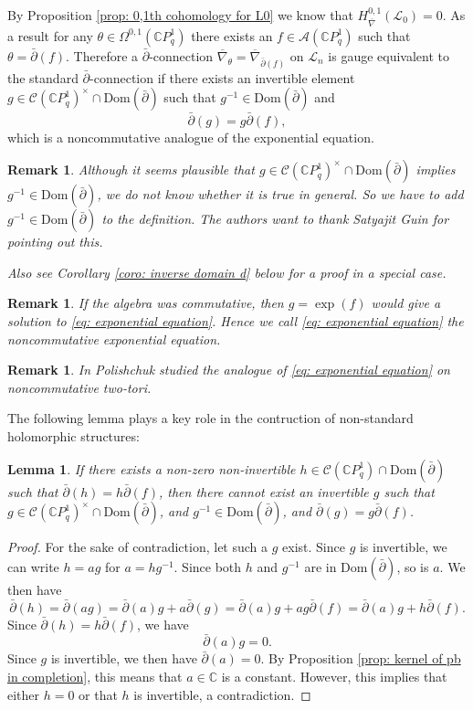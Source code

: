 \documentclass[12pt]{article}
\newtheorem{remark}[definition]{Remark}
\newtheorem{lemma}[definition]{Lemma}
\numberwithin{equation}{section}
\def\Dom{{\mathrm {Dom}}}
\def\pb{\bar{\partial}}
\def\C{{\mathbb C}}
\def\A{\mathcal{A}}
\def\L{\mathcal{L}}
\begin{document}
By Proposition \ref{prop: 0,1th cohomology for L0} we know that $H^{0,1}_{\overline{\nabla}}(\L_0)=0.$ As a result for any $\theta\in \Omega^{0,1}(\C P^1_q)$ there exists an $f\in \A(\C P^1_q)$ such that $\theta=\pb (f)$. Therefore a $\pb$-connection $\overline{\nabla}_{\theta}=\overline{\nabla}_{\pb(f)}$ on  $\L_n$ is gauge equivalent to the standard $\pb$-connection if there exists an invertible element $g\in \mathcal{C}(\C P^1_q)^{\times}\cap \Dom(\pb)$ such that $g^{-1}\in \Dom(\pb)$ and
     \begin{equation}\label{eq: exponential equation}
        \pb(g)=g\pb(f),
     \end{equation}
which is a noncommutative analogue of the exponential equation.

\begin{remark}
Although it seems plausible that $g\in \mathcal{C}(\C P^1_q)^{\times}\cap \Dom(\pb)$ implies $g^{-1}\in \Dom(\pb)$, we do not know whether it is true in general. So we have to add $g^{-1}\in \Dom(\pb)$ to the definition. The authors want to thank Satyajit Guin for pointing out this. 

Also see Corollary \ref{coro: inverse domain d} below for a proof in a special case.
\end{remark}

\begin{remark}
If the algebra was commutative, then $g=\exp(f)$ would give a solution to \eqref{eq: exponential equation}. Hence we call \eqref{eq: exponential equation} the noncommutative exponential equation.
\end{remark}


\begin{remark}
In \cite{polishchuk2006analogues} Polishchuk studied the analogue of \eqref{eq: exponential equation} on noncommutative two-tori.
\end{remark}

The following lemma plays a key role in the contruction of non-standard holomorphic structures:

\begin{lemma}\label{lemma: non zero solution non gauge equivalent}
    If there exists a non-zero non-invertible $h \in \mathcal{C}(\C P^1_q)\cap \Dom(\pb)$ such that $\pb (h) = h \pb (f)$, then there cannot exist an invertible $g$ such that  $g\in \mathcal{C}(\C P^1_q)^{\times}\cap \Dom(\pb)$, and  $g^{-1}\in \Dom(\pb)$, and $\pb (g) = g \pb (f)$.
\end{lemma}
\begin{proof}
    For the sake of contradiction, let such a $g$ exist. Since $g$ is invertible, we can write   $h = ag$ for $a = h g^{-1}$. Since both $h$ and $g^{-1}$ are in $\Dom(\pb)$, so is $a$.  We then  have
    $$
    \pb(h)=\pb(ag)=\pb(a)g+a\pb(g)=\pb(a)g+ag\pb(f)=\pb(a)g+h\pb(f).
    $$
    Since $\pb (h) = h \pb (f)$, we have \[
     \pb(a) g = 0.
    \]
    Since $g$ is invertible, we then have $\pb(a) = 0$. By Proposition \ref{prop: kernel of pb in completion}, this means that $a\in \C $ is a constant. However, this implies that either $h = 0$ or that $h$ is invertible, a contradiction.
\end{proof}
\end{document}
